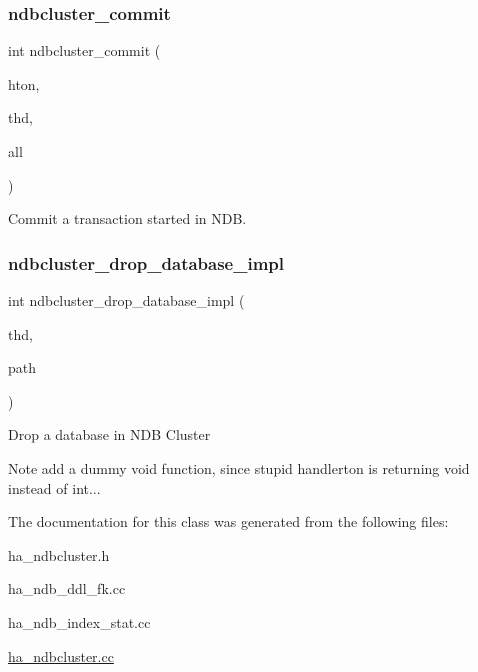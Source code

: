 \subsubsection{\texorpdfstring{ndbcluster\+\_\+commit}{ndbcluster\_commit}}
{\footnotesize\ttfamily int ndbcluster\+\_\+commit (\begin{DoxyParamCaption}\item[{\mbox{\hyperlink{structhandlerton}{handlerton}} $\ast$}]{hton,  }\item[{T\+HD $\ast$}]{thd,  }\item[{bool}]{all }\end{DoxyParamCaption})\hspace{0.3cm}{\ttfamily [friend]}}

Commit a transaction started in N\+DB. \mbox{\label{classha__ndbcluster_a81d2867500d8a5c574e4e22d1b407d80}} 
\subsubsection{\texorpdfstring{ndbcluster\+\_\+drop\+\_\+database\+\_\+impl}{ndbcluster\_drop\_database\_impl}}
{\footnotesize\ttfamily int ndbcluster\+\_\+drop\+\_\+database\+\_\+impl (\begin{DoxyParamCaption}\item[{T\+HD $\ast$}]{thd,  }\item[{const char $\ast$}]{path }\end{DoxyParamCaption})\hspace{0.3cm}{\ttfamily [friend]}}

Drop a database in N\+DB Cluster

\begin{DoxyNote}{Note}
add a dummy void function, since stupid handlerton is returning void instead of int... 
\end{DoxyNote}


The documentation for this class was generated from the following files\+:\begin{DoxyCompactItemize}
\item 
ha\+\_\+ndbcluster.\+h\item 
ha\+\_\+ndb\+\_\+ddl\+\_\+fk.\+cc\item 
ha\+\_\+ndb\+\_\+index\+\_\+stat.\+cc\item 
\mbox{\hyperlink{ha__ndbcluster_8cc}{ha\+\_\+ndbcluster.\+cc}}\end{DoxyCompactItemize}
